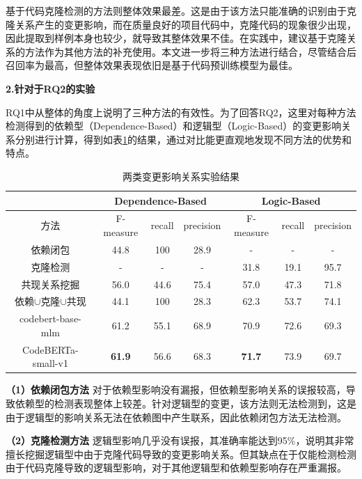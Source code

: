 基于代码克隆检测的方法则整体效果最差。这是由于该方法只能准确的识别由于克隆关系产生的变更影响，而在质量良好的项目代码中，克隆代码的现象很少出现，因此提取到样例本身也较少，就导致其整体效果不佳。在实践中，建议基于克隆关系的方法作为其他方法的补充使用。本文进一步将三种方法进行结合，尽管结合后召回率为最高，但整体效果表现依旧是基于代码预训练模型为最佳。

\textbf{2.针对于RQ2的实验}

RQ1中从整体的角度上说明了三种方法的有效性。为了回答RQ2，这里对每种方法检测得到的依赖型（Dependence-Based）和逻辑型（Logic-Based）的变更影响关系分别进行计算，得到如表\ref{1_两类变更影响关系实验结果}的结果，通过对比能更直观地发现不同方法的优势和特点。


\begin{table}[htbp]
\caption{两类变更影响关系实验结果}
\label{1_两类变更影响关系实验结果}
\vspace{0.5em}\centering\wuhao
\begin{tabular}{c|ccc|ccc}
\toprule
  & \multicolumn{3}{c|}{Dependence-Based} & \multicolumn{3}{c}{Logic-Based}  \\
\midrule
方法 & F-measure & recall & precision & F-measure & recall & precision  \\
\midrule
依赖闭包 &  44.8 & 100 & 28.9 & - & - & -  \\
克隆检测 &  - & - & - & 31.8 & 19.1 & 95.7 \\
共现关系挖掘 &  56.0 & 44.6 & 75.4 & 57.0 & 47.3 & 71.8 \\
依赖$\cup$克隆$\cup$共现 &  44.1 & 100 & 28.3 & 62.3 & 53.7 & 74.1 \\
codebert-base-mlm &   61.2 & 55.1 & 68.9 & 70.9 & 72.6 & 69.3 \\
CodeBERTa-small-v1 &   \textbf{61.9} & 56.6 & 68.3 & \textbf{71.7} & 73.9 & 69.7 \\
\bottomrule
\end{tabular}
\end{table}

\textbf{（1）依赖闭包方法} \hspace{2mm}对于依赖型影响没有漏报，但依赖型影响关系的误报较高，导致依赖型的检测表现整体上较差。针对逻辑型的变更，该方法则无法检测到，这是由于逻辑型的影响关系无法在依赖图中产生联系，因此依赖闭包方法无法检测。

\textbf{（2）克隆检测方法} \hspace{2mm}逻辑型影响几乎没有误报，其准确率能达到95\%，说明其非常擅长挖掘逻辑型中由于克隆代码导致的变更影响关系。但其缺点在于仅能检测检测由于代码克隆导致的逻辑型影响，对于其他逻辑型和依赖型影响存在严重漏报。
    
